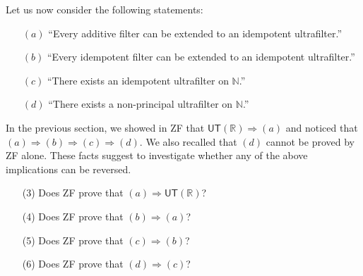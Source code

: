 \documentclass{amsart}
\theoremstyle{definition}
\theoremstyle{remark}
\def\N{\mathbb{N}}
\def\R{\mathbb{R}}
\begin{document}
\smallskip
Let us now consider the following statements:

\begin{enumerate}
\item[$(a)$]
``Every additive filter can be extended to an idempotent ultrafilter.''

\item[$(b)$]
``Every idempotent filter can be extended to an idempotent ultrafilter.''

\smallskip
\item[$(c)$]
``There exists an idempotent ultrafilter on $\N$.''

\smallskip
\item[$(d)$]
``There exists a non-principal ultrafilter on $\N$.''
\end{enumerate}
\smallskip

In the previous section, we showed in \textsf{ZF} that 
$\textsf{UT}(\mathbb{R})\Rightarrow (a)$ and noticed
that $(a)\Rightarrow(b)\Rightarrow(c)\Rightarrow(d)$.
We also recalled that $(d)$ cannot be proved by \textsf{ZF} alone.
These facts suggest to investigate whether
any of the above implications can be reversed.

\begin{enumerate}
\item[(3)]
Does \textsf{ZF} prove that $(a)\Rightarrow\textsf{UT}(\mathbb{R})$?

\smallskip
\item[(4)]
Does \textsf{ZF} prove that $(b)\Rightarrow(a)$?

\smallskip
\item[(5)]
Does \textsf{ZF} prove that $(c)\Rightarrow(b)$?

\smallskip
\item[(6)]
Does \textsf{ZF} prove that $(d)\Rightarrow(c)$?
\end{enumerate}


\end{document}
